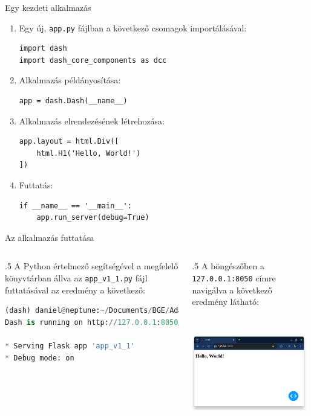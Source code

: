 \documentclass[english, aspectratio=169]{beamer}
\begin{document}
\begin{frame}[fragile]{Egy kezdeti alkalmazás}
	\begin{enumerate}
		\item Egy új, \texttt{app.py} fájlban a következő csomagok importálásával:
			\begin{lstlisting}
import dash
import dash_core_components as dcc
			\end{lstlisting}
		\item Alkalmazás példányosítása:
			\begin{lstlisting}
app = dash.Dash(__name__)
			\end{lstlisting}
		\item Alkalmazás elrendezésének létrehozása:
			\begin{lstlisting}
app.layout = html.Div([
	html.H1('Hello, World!')
])
			\end{lstlisting}
		\item Futtatás:
			\begin{lstlisting}
if __name__ == '__main__':
	app.run_server(debug=True)
			\end{lstlisting}
	\end{enumerate}
\end{frame}

\begin{frame}[fragile]{Az alkalmazás futtatása}
	\begin{columns}
		\begin{column}{.5\textwidth}
			A Python értelmező segítségével a megfelelő könyvtárban állva az \texttt{app\_v1\_1.py} fájl futtatásával az eredmény a következő:
			\begin{lstlisting}[language=python]
(dash) daniel@neptune:~/Documents/BGE/Adatbanyaszat/2_dash/code$ python app_v1_1.py
Dash is running on http://127.0.0.1:8050/
	
* Serving Flask app 'app_v1_1'
* Debug mode: on
			\end{lstlisting}
		\end{column}
		\begin{column}{.5\textwidth}
			A böngészőben a \texttt{127.0.0.1:8050} címre navigálva a következő eredmény látható:
			\begin{center}
				\includegraphics[width=5cm, height=5cm, keepaspectratio]{images/dash_5.png}
			\end{center}
		\end{column}
	\end{columns}
\end{frame}
\end{document}
